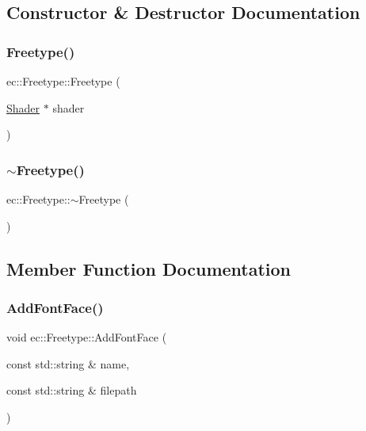 \subsection{Constructor \& Destructor Documentation}
\mbox{\label{classec_1_1_freetype_a77da5cdd8b053a5fea7c5ffd78c39418}} 
\subsubsection{\texorpdfstring{Freetype()}{Freetype()}}
{\footnotesize\ttfamily ec\+::\+Freetype\+::\+Freetype (\begin{DoxyParamCaption}\item[{\mbox{\hyperlink{classec_1_1_shader}{Shader}} $\ast$}]{shader }\end{DoxyParamCaption})\hspace{0.3cm}{\ttfamily [explicit]}}

\mbox{\label{classec_1_1_freetype_a35e8fad09705600cdd263ed3781d299b}} 
\subsubsection{\texorpdfstring{$\sim$\+Freetype()}{~Freetype()}}
{\footnotesize\ttfamily ec\+::\+Freetype\+::$\sim$\+Freetype (\begin{DoxyParamCaption}{ }\end{DoxyParamCaption})}



\subsection{Member Function Documentation}
\mbox{\label{classec_1_1_freetype_afd97735b55445abf79289deccba26f31}} 
\subsubsection{\texorpdfstring{Add\+Font\+Face()}{AddFontFace()}}
{\footnotesize\ttfamily void ec\+::\+Freetype\+::\+Add\+Font\+Face (\begin{DoxyParamCaption}\item[{const std\+::string \&}]{name,  }\item[{const std\+::string \&}]{filepath }\end{DoxyParamCaption})}

